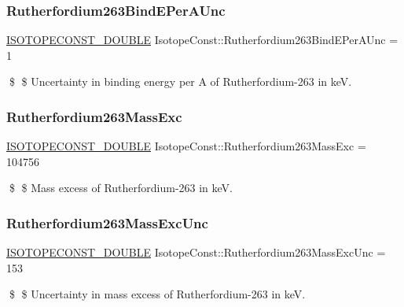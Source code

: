 \subsubsection{\texorpdfstring{Rutherfordium263\+Bind\+E\+Per\+A\+Unc}{Rutherfordium263BindEPerAUnc}}
{\footnotesize\ttfamily \mbox{\hyperlink{group___isotope_const-_macros_ga8f45a7272ce02c0b4c65c44636ed719a}{I\+S\+O\+T\+O\+P\+E\+C\+O\+N\+S\+T\+\_\+\+D\+O\+U\+B\+LE}} Isotope\+Const\+::\+Rutherfordium263\+Bind\+E\+Per\+A\+Unc = 1}

\$ \$ Uncertainty in binding energy per A of Rutherfordium-\/263 in keV. \mbox{\label{group___isotope_const-_rutherfordium-_rf263_ga4adbe609a2bbd912a152fd78ff68497e}} 
\subsubsection{\texorpdfstring{Rutherfordium263\+Mass\+Exc}{Rutherfordium263MassExc}}
{\footnotesize\ttfamily \mbox{\hyperlink{group___isotope_const-_macros_ga8f45a7272ce02c0b4c65c44636ed719a}{I\+S\+O\+T\+O\+P\+E\+C\+O\+N\+S\+T\+\_\+\+D\+O\+U\+B\+LE}} Isotope\+Const\+::\+Rutherfordium263\+Mass\+Exc = 104756}

\$ \$ Mass excess of Rutherfordium-\/263 in keV. \mbox{\label{group___isotope_const-_rutherfordium-_rf263_gae8f557850ffc46bab35ba76247b3f497}} 
\subsubsection{\texorpdfstring{Rutherfordium263\+Mass\+Exc\+Unc}{Rutherfordium263MassExcUnc}}
{\footnotesize\ttfamily \mbox{\hyperlink{group___isotope_const-_macros_ga8f45a7272ce02c0b4c65c44636ed719a}{I\+S\+O\+T\+O\+P\+E\+C\+O\+N\+S\+T\+\_\+\+D\+O\+U\+B\+LE}} Isotope\+Const\+::\+Rutherfordium263\+Mass\+Exc\+Unc = 153}

\$ \$ Uncertainty in mass excess of Rutherfordium-\/263 in keV. \mbox{\label{group___isotope_const-_rutherfordium-_rf263_ga49b1b76a16f8b190397a4f9443e6d981}} 
